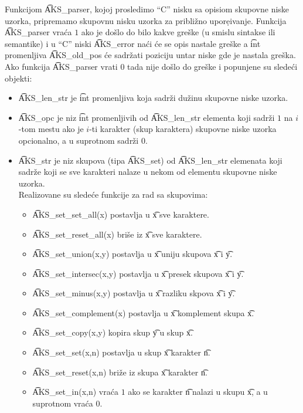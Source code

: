     Funkcijom \t{AKS\_parser}, kojoj prosledimo ``C'' nisku sa opisiom
    skupovne niske uzorka, pripremamo skupovnu nisku uzorka za pribli\v{z}no
    upore{\d}ivanje.
    Funkcija \t{AKS\_parser} vra\'ca $1$ ako je do\v{s}lo do bilo kakve
    gre\v{s}ke (u smislu sintakse ili semantike) i u ``C'' niski
    \t{AKS\_error} na\'ci \'ce se opis nastale gre\v{s}ke a \t{int}
    promenljiva \t{AKS\_old\_pos} \'ce sadr\v{z}ati poziciju untar niske gde
    je nastala gre\v{s}ka.
    Ako funkcija \t{AKS\_parser} vrati 0 tada nije do\v{s}lo do gre\v{s}ke i
    popunjene su slede\'ci objekti:
    \begin{itemize}
      \item
        \t{AKS\_len\_str} je \t{int} promenljiva koja sadr\v{z}i du\v{z}inu
        skupovne niske uzorka.
      \item
        \t{AKS\_opc} je niz \t{int} promenljivih od \t{AKS\_len\_str} elementa
        koji sadr\v{z}i $1$ na $i$-tom mestu ako je $i$-ti karakter (skup
        karaktera) skupovne niske uzorka opcionalno, a u suprotnom sadr\v{z}i
        $0$.
      \item
        \t{AKS\_str} je niz skupova (tipa \t{AKS\_set}) od \t{AKS\_len\_str}
        elemenata koji sadr\v{z}e koji se sve karakteri nalaze u nekom od
        elementu skupovne niske uzorka.\\
        Realizovane su slede\'ce funkcije za rad sa skupovima:
        \begin{itemize}
          \item
             \t{AKS\_set\_set\_all(x)} postavlja u \t{x} sve karaktere.
          \item
             \t{AKS\_set\_reset\_all(x)} bri\v{s}e iz \t{x} sve karaktere.
          \item
             \t{AKS\_set\_union(x,y)} postavlja u \t{x} uniju skupova \t{x} i
             \t{y}.
          \item
             \t{AKS\_set\_intersec(x,y)} postavlja u \t{x} presek skupova
             \t{x} i \t{y}.
          \item
             \t{AKS\_set\_minus(x,y)} postavlja u \t{x} razliku skpova \t{x} i
             \t{y}.
          \item
             \t{AKS\_set\_complement(x)} postavlja u \t{x} komplement skupa \t{x}.
          \item
             \t{AKS\_set\_copy(x,y)} kopira skup \t{y} u skup \t{x}.
          \item
             \t{AKS\_set\_set(x,n)} postavlja u skup \t{x} karakter \t{n}.
          \item
             \t{AKS\_set\_reset(x,n)} bri\v{z}e iz skupa \t{x} karakter \t{n}.
          \item
             \t{AKS\_set\_in(x,n)} vra\'ca $1$ ako se karakter \t{n} nalazi u
             skupu \t{x}, a u suprotnom vra\'ca $0$.
        \end{itemize}
    \end{itemize}
